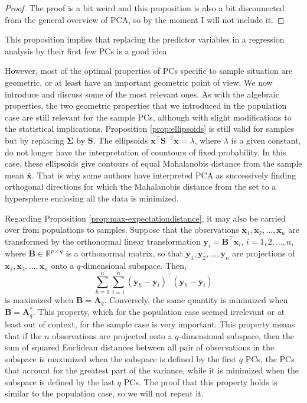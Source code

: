 \documentclass[11pt, oneside]{book}
\theoremstyle{plain}
\theoremstyle{remark}
\newcommand*{\mbf}[1]{\mathbf{#1}}
\begin{document}
\begin{proof}
    The proof is a bit weird and this proposition is also a  bit disconnected
    from the general overview of PCA, so by the moment I will not include it. 
\end{proof}    
This proposition implies that replacing the predictor variables in a regression
analysis by their first few PCs is a good idea

However, most of the optimal properties of PCs specific to sample situation are
geometric, or at least have an important geometric point of view. We now
introduce and discuss some of the most relevant ones. As with the algebraic
properties, the two geometric properties that we introduced in the population
case are still relevant for the sample PCs, although with slight modifications
to the statistical implications. Proposition \ref{prop:ellipsoids} is still
valid for samples but by replacing $\mbf{\Sigma}$ by $\mathbf{S}$. The
ellipsoids $\mbf{x}^\top\mbf{S}^{-1}\mbf{x} = \lambda$, where $\lambda$ is a
given constant, do not longer have the interpretation of countours of fixed
probability. In this case, these ellipsoids give contours of equal Mahalanobis
distance from the sample mean $\bar{\mbf{x}}$. That is why some authors have
interpreted PCA as successively finding orthogonal directions for which the
Mahalanobis distance from the set to a hypersphere enclosing all the data is
minimized. 

Regarding Proposition \ref{prop:max-expectationdistance}, it may also
be carried over from populations to samples. Suppose that the observations
$\mbf{x}_1,\mbf{x}_2,\dots,\mbf{x}_n$ are transformed by the orthonormal linear
transformation $\mbf{y}_i = \mbf{B}^\top\mbf{x}_i$, $i=1,2,\dots,n,$ where
$\mbf{B}\in\mathbb{R}^{p\times q}$ is a orthonormal matrix, so that
$\mbf{y}_1,\mbf{y}_2,\dots,\mbf{y}_n$ are projections of
$\mbf{x}_1,\mbf{x}_2,\dots,\mbf{x}_n$ onto a $q$-dimensional subspace. Then,
$$\sum_{h=1}^n\sum_{i=1}^n(\mbf{y}_h-\mbf{y}_i)^\top(\mbf{y}_h-\mbf{y}_i)$$ is
maximized when $\mbf{B} = \mbf{A}_q$. Conversely, the same quantity is minimized
when $\mbf{B} = \mbf{A}_q^*.$ This property, which for the population case
seemed irrelevant or at least out of context, for the sample case is very
important. This property means that if the $n$ observations are projected onto a
$q$-dimensional subspace, then the sum of squared Euclidean distances between
all pair of observations in the subspace is maximized when the subspace is
defined by the first $q$ PCs, the PCs that account for the greatest part of the
variance, while it is minimized when the subspace is defined by the last $q$
PCs. The proof that this property holds is similar to the population case, so we
will not repeat it. 
\end{document}
